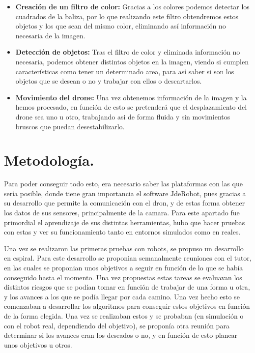 \begin{itemize}
	\item \textbf{Creaci\'on de un filtro de color:} Gracias a los colores podemos detectar los cuadrados de la baliza, por lo que realizando este filtro obtendremos estos objetos y los que sean del mismo color, eliminando as\'i informaci\'on no necesaria de la imagen.
	
	\item \textbf{Detecci\'on de objetos: } Tras el filtro de color y eliminada informaci\'on no necesaria, podemos obtener distintos objetos en la imagen, viendo si cumplen caracter\'isticas como tener un determinado area, para as\'i saber si son los objetos que se desean o no y trabajar con ellos o descartarlos. 
	
	\item \textbf{Movimiento del drone: } Una vez obtenemos informaci\'on de la imagen y la hemos procesado, en funci\'on de esto se pretender\'a que el desplazamiento del drone sea uno u otro, trabajando asi de forma fluida y sin movimientos bruscos que puedan desestabilizarlo.   

\end{itemize}


\section{Metodolog\'ia.}
\hspace{1 cm} Para poder conseguir todo esto, era necesario saber las plataformas con las que ser\'ia posible, donde tiene gran importancia el software JdeRobot, pues gracias a su desarrollo que permite la comunicaci\'on con el dron, y de estas forma obtener los datos de sus sensores, principalmente de la camara. Para este apartado fue primordial el aprendizaje de sus distintas herramientas, hubo que hacer pruebas con estas y ver su funcionamiento tanto en entornos simulados como en reales.

\hspace{1 cm}Una vez se realizaron las primeras pruebas con robots, se propuso un desarrollo en espiral. Para este desarrollo se proponian semanalmente reuniones con el tutor, en las cuales se proponian unos objetivos a seguir en funci\'on de lo que se hab\'ia conseguido hasta el momento. Una vez propuestas estas tareas se evaluavan los distintos riesgos que se pod\'ian tomar en funci\'on de trabajar de una forma u otra, y los avances a los que se pod\'ia llegar por cada camino. Una vez hecho esto se comenzaban a desarrollar los algoritmos para conseguir estos objetivos en funci\'on de la forma elegida. Una vez se realizaban estos y se probaban (en simulaci\'on o con el robot real, dependiendo del objetivo), se propon\'ia otra reuni\'on para determinar si los avances eran los deseados o no, y en funci\'on de esto planear unos objetivos u otros.  

